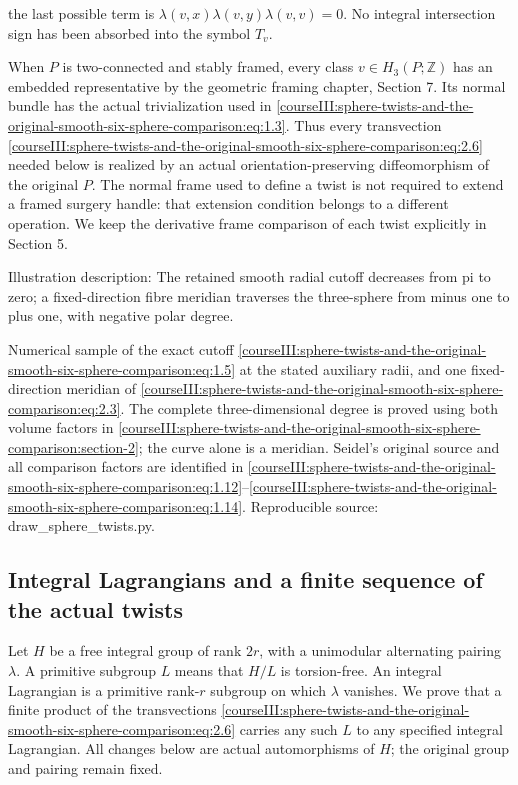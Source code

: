 the last possible term is \(\lambda(v,x)\lambda(v,y)\lambda(v,v)=0\). No integral intersection sign has been absorbed into the symbol \(T_v\).

When \(P\) is two-connected and stably framed, every class \(v\in H_3(P;\mathbb Z)\) has an embedded representative by the geometric framing chapter, Section 7. Its normal bundle has the actual trivialization used in \eqref{courseIII:sphere-twists-and-the-original-smooth-six-sphere-comparison:eq:1.3}. Thus every transvection \eqref{courseIII:sphere-twists-and-the-original-smooth-six-sphere-comparison:eq:2.6} needed below is realized by an actual orientation-preserving diffeomorphism of the original \(P\). The normal frame used to define a twist is not required to extend a framed surgery handle: that extension condition belongs to a different operation. We keep the derivative frame comparison of each twist explicitly in Section 5.

Illustration description: The retained smooth radial cutoff decreases from pi to zero; a fixed-direction fibre meridian traverses the three-sphere from minus one to plus one, with negative polar degree.

Numerical sample of the exact cutoff \eqref{courseIII:sphere-twists-and-the-original-smooth-six-sphere-comparison:eq:1.5} at the stated auxiliary radii, and one fixed-direction meridian of \eqref{courseIII:sphere-twists-and-the-original-smooth-six-sphere-comparison:eq:2.3}. The complete three-dimensional degree is proved using both volume factors in \cref{courseIII:sphere-twists-and-the-original-smooth-six-sphere-comparison:section-2}; the curve alone is a meridian. Seidel's original source and all comparison factors are identified in \eqref{courseIII:sphere-twists-and-the-original-smooth-six-sphere-comparison:eq:1.12}--\eqref{courseIII:sphere-twists-and-the-original-smooth-six-sphere-comparison:eq:1.14}. Reproducible source: draw\_sphere\_twists.py.

\subsection{Integral Lagrangians and a finite sequence of the actual twists}
\label{courseIII:sphere-twists-and-the-original-smooth-six-sphere-comparison:twist-integral-lagrangians}

\label{courseIII:sphere-twists-and-the-original-smooth-six-sphere-comparison:section-3}

Let \(H\) be a free integral group of rank \(2r\), with a unimodular alternating pairing \(\lambda\). A primitive subgroup \(L\) means that \(H/L\) is torsion-free. An integral Lagrangian is a primitive rank-\(r\) subgroup on which \(\lambda\) vanishes. We prove that a finite product of the transvections \eqref{courseIII:sphere-twists-and-the-original-smooth-six-sphere-comparison:eq:2.6} carries any such \(L\) to any specified integral Lagrangian. All changes below are actual automorphisms of \(H\); the original group and pairing remain fixed.

